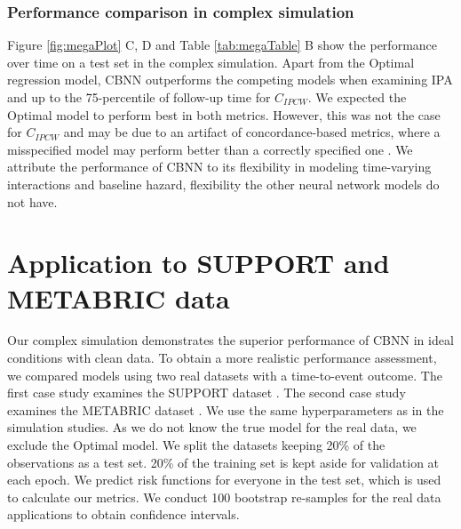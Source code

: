 \documentclass[APA,LATO1COL]{WileyNJD-v2}
\begin{document}
\hypertarget{performance-comparison-in-complex-simulation}{%
\subsubsection{Performance comparison in complex
simulation}\label{performance-comparison-in-complex-simulation}}

Figure \ref{fig:megaPlot} C, D and Table \ref{tab:megaTable} B show the
performance over time on a test set in the complex simulation. Apart
from the Optimal regression model, CBNN outperforms the competing models
when examining IPA and up to the 75-percentile of follow-up time for
\(C_{IPCW}\). We expected the Optimal model to perform best in both
metrics. However, this was not the case for \(C_{IPCW}\) and may be due
to an artifact of concordance-based metrics, where a misspecified model
may perform better than a correctly specified one
\citep{cindexfails2019}. We attribute the performance of CBNN to its
flexibility in modeling time-varying interactions and baseline hazard,
flexibility the other neural network models do not have.



\hypertarget{casestudies}{%
\section{Application to SUPPORT and METABRIC data}\label{casestudies}}

Our complex simulation demonstrates the superior performance of CBNN in
ideal conditions with clean data. To obtain a more realistic performance
assessment, we compared models using two real datasets with a
time-to-event outcome. The first case study examines the SUPPORT dataset
\citep{knaus1995SUPPORT}. The second case study examines the METABRIC
dataset \citep{curtis2012genomic}. We use the same hyperparameters as in
the simulation studies. As we do not know the true model for the real
data, we exclude the Optimal model. We split the datasets keeping 20\%
of the observations as a test set. 20\% of the training set is kept
aside for validation at each epoch. We predict risk functions for
everyone in the test set, which is used to calculate our metrics. We
conduct 100 bootstrap re-samples for the real data applications to
obtain confidence intervals.
\end{document}
